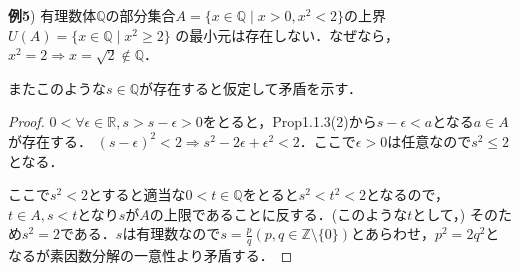 \documentclass{ltjsarticle}
\theoremstyle{definition}
\theoremstyle{propcorollarystyle}
\theoremstyle{thmcorollarystyle}
\begin{document}
\textbf{例5}) 有理数体$\mathbb{Q}$の部分集合$A=\{x \in \mathbb{Q} \mid x >0, x^{2} <2\}$の上界$U(A)=\{x \in \mathbb{Q} \mid x^{2} \ge 2\}$
の最小元は存在しない．なぜなら，$x^{2}=2 \Rightarrow x=\sqrt{2} \notin \mathbb{Q}$．\par
またこのような$s \in \mathbb{Q}$が存在すると仮定して矛盾を示す．
\begin{proof}
  $0 < \forall \epsilon \in \mathbb{R}, s > s- \epsilon >0$をとると，Prop1.1.3(2)から$s - \epsilon < a$となる$a \in A$が存在する．
  $(s - \epsilon)^{2} < 2 \Rightarrow s^{2}-2\epsilon +\epsilon^{2} < 2 $．ここで$\epsilon > 0$は任意なので$s^{2} \le 2$となる．\par
  ここで$s^{2} < 2$とすると適当な$0<t\in \mathbb{Q}$をとると$s^{2}<t^{2}<2$となるので，$t \in A, s<t$となり$s$が$A$の上限であることに反する．(このような$t$として，)
  そのため$s^{2}=2$である．$s$は有理数なので$s=\frac{p}{q}(p, q \in \mathbb{Z}\setminus \{0\})$とあらわせ，$p^{2}=2q^{2}$となるが素因数分解の一意性より矛盾する．
\end{proof}
\end{document}
